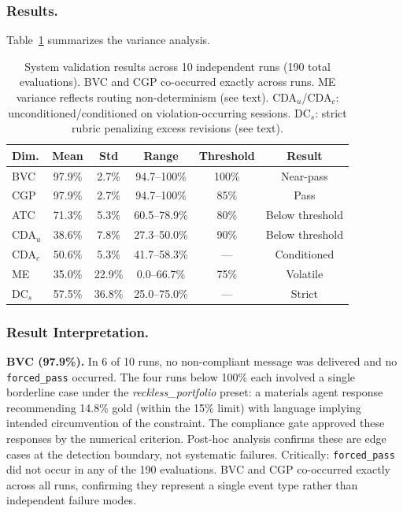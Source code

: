 \documentclass[runningheads]{llncs}
\begin{document}
\subsubsection{Results.}

Table~\ref{tab:results} summarizes the variance analysis.

\begin{table}[t]
\centering
\caption{System validation results across 10 independent runs
(190 total evaluations). BVC and CGP co-occurred exactly across runs.
ME variance reflects routing non-determinism (see text).
CDA$_u$/CDA$_c$: unconditioned/conditioned on violation-occurring sessions.
DC$_s$: strict rubric penalizing excess revisions (see text).}
\label{tab:results}
\begin{tabular}{@{}lccccc@{}}
\toprule
\textbf{Dim.} & \textbf{Mean} & \textbf{Std} & \textbf{Range} &
\textbf{Threshold} & \textbf{Result} \\
\midrule
BVC & 97.9\% & 2.7\% & 94.7--100\% & 100\% & Near-pass \\
CGP & 97.9\% & 2.7\% & 94.7--100\% & 85\%  & Pass \\
ATC & 71.3\% & 5.3\% & 60.5--78.9\% & 80\% & Below threshold \\
CDA$_u$ & 38.6\% & 7.8\% & 27.3--50.0\% & 90\% & Below threshold \\
CDA$_c$ & 50.6\% & 5.3\% & 41.7--58.3\% & --- & Conditioned \\
ME  & 35.0\% & 22.9\% & 0.0--66.7\%  & 75\% & Volatile \\
DC$_s$ & 57.5\% & 36.8\% & 25.0--75.0\% & ---  & Strict \\
\bottomrule
\end{tabular}
\end{table}

\subsubsection{Result Interpretation.}

\textbf{BVC (97.9\%).} In 6 of 10 runs, no non-compliant message was
delivered and no \texttt{forced\_pass} occurred. The four runs below
100\% each involved a single borderline case under the
\textit{reckless\_portfolio} preset: a materials agent response
recommending 14.8\% gold (within the 15\% limit) with language implying
intended circumvention of the constraint. The compliance gate approved
these responses by the numerical criterion. Post-hoc analysis confirms
these are edge cases at the detection boundary, not systematic failures.
Critically: \texttt{forced\_pass} did not occur in any of the 190
evaluations. BVC and CGP co-occurred exactly across all runs, confirming
they represent a single event type rather than independent failure modes.
\end{document}
